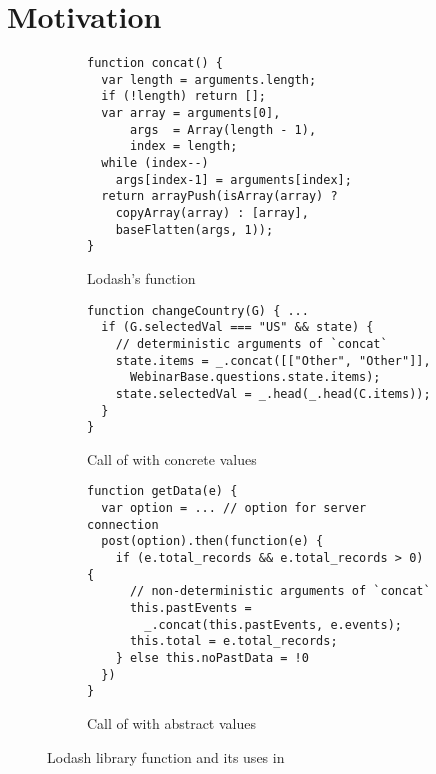 \section{Motivation}\label{sec:motivation}

\begin{figure}[t]
  \centering
  \begin{subfigure}[t]{0.5\textwidth}
    \begin{lstlisting}[style=myJSstyle]
function concat() {
  var length = arguments.length;
  if (!length) return [];
  var array = arguments[0],
      args  = Array(length - 1),
      index = length;
  while (index--)
    args[index-1] = arguments[index];
  return arrayPush(isArray(array) ?
    copyArray(array) : [array],
    baseFlatten(args, 1));
}
    \end{lstlisting}
    \vspace*{-1em}
    \caption{Lodash's  function}
    \label{fig:concat}
  \end{subfigure}
  \begin{subfigure}[t]{0.5\textwidth}
    \begin{lstlisting}[style=myJSstyle,firstnumber=13]
function changeCountry(G) { ...
  if (G.selectedVal === "US" && state) {
    // deterministic arguments of `concat`
    state.items = _.concat([["Other", "Other"]],
      WebinarBase.questions.state.items);
    state.selectedVal = _.head(_.head(C.items));
  }
}
    \end{lstlisting}
    \vspace*{-1em}
    \caption{Call of  with concrete values}
    \label{fig:changeCountry}
  \end{subfigure}
  \begin{subfigure}[t]{0.5\textwidth}
    \begin{lstlisting}[style=myJSstyle,firstnumber=22]
function getData(e) {
  var option = ... // option for server connection
  post(option).then(function(e) {
    if (e.total_records && e.total_records > 0) {
      // non-deterministic arguments of `concat`
      this.pastEvents =
        _.concat(this.pastEvents, e.events);
      this.total = e.total_records;
    } else this.noPastData = !0
  })
}
    \end{lstlisting}
    \vspace*{-1em}
    \caption{Call of  with abstract values}
    \label{fig:getData}
  \end{subfigure}
  \vspace*{-1em}
  \caption{Lodash library function and its uses in }
  \label{fig:example}
  \vspace*{-1em}
\end{figure}

